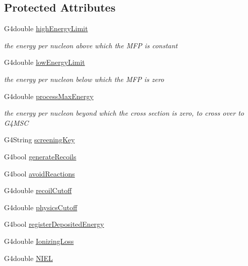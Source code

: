 \subsection*{Protected Attributes}
\begin{DoxyCompactItemize}
\item 
G4double \hyperlink{classG4ScreenedNuclearRecoil_a2851b050a8dd1473dd893737ae0d9c3a}{high\+Energy\+Limit}
\begin{DoxyCompactList}\small\item\em the energy per nucleon above which the M\+FP is constant \end{DoxyCompactList}\item 
G4double \hyperlink{classG4ScreenedNuclearRecoil_aea83086541a85ac4cc0ad44c11e0fc21}{low\+Energy\+Limit}
\begin{DoxyCompactList}\small\item\em the energy per nucleon below which the M\+FP is zero \end{DoxyCompactList}\item 
G4double \hyperlink{classG4ScreenedNuclearRecoil_a1953ae04bf9ef546cc16d07291cd8819}{process\+Max\+Energy}
\begin{DoxyCompactList}\small\item\em the energy per nucleon beyond which the cross section is zero, to cross over to G4\+M\+SC \end{DoxyCompactList}\item 
G4\+String \hyperlink{classG4ScreenedNuclearRecoil_a297640f55e7819423579c1123501123d}{screening\+Key}
\item 
G4bool \hyperlink{classG4ScreenedNuclearRecoil_a89431b3d4402b888a5d422e153a45296}{generate\+Recoils}
\item 
G4bool \hyperlink{classG4ScreenedNuclearRecoil_a09d5f47fb3f261d777d2dd0a663d199f}{avoid\+Reactions}
\item 
G4double \hyperlink{classG4ScreenedNuclearRecoil_ad3319321c3b8319822dc9d4a11e046d2}{recoil\+Cutoff}
\item 
G4double \hyperlink{classG4ScreenedNuclearRecoil_a8d61b6227a742762fe364e1f376d3265}{physics\+Cutoff}
\item 
G4bool \hyperlink{classG4ScreenedNuclearRecoil_a216384f2d51fb1a347124b977e093c05}{register\+Deposited\+Energy}
\item 
G4double \hyperlink{classG4ScreenedNuclearRecoil_afa3ff45a02312f7b6a6c1d500fd01f28}{Ionizing\+Loss}
\item 
G4double \hyperlink{classG4ScreenedNuclearRecoil_ad659b5541a6a1e34109bf3a38a805cf7}{N\+I\+EL}

\end{DoxyCompactItemize}
